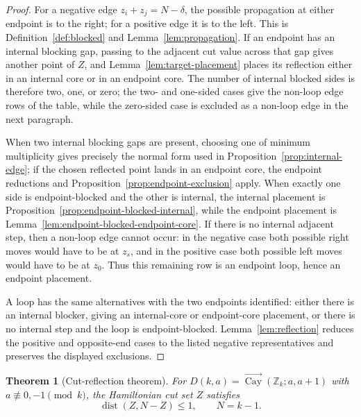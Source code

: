 \documentclass[11pt]{article}
\newtheorem{theorem}{Theorem}[section]
\newcommand{\Cay}{\overrightarrow{\operatorname{Cay}}}
\newcommand{\Z}{\mathbb Z}
\newcommand{\dist}{\operatorname{dist}}
\begin{document}
\begin{proof}
For a negative edge \(z_i+z_j=N-\delta\), the possible propagation at either endpoint is to the right; for a positive edge it is to the left.  This is Definition~\ref{def:blocked} and Lemma~\ref{lem:propagation}.  If an endpoint has an internal blocking gap, passing to the adjacent cut value across that gap gives another point of \(Z\), and Lemma~\ref{lem:target-placement} places its reflection either in an internal core or in an endpoint core.  The number of internal blocked sides is therefore two, one, or zero; the two- and one-sided cases give the non-loop edge rows of the table, while the zero-sided case is excluded as a non-loop edge in the next paragraph.

When two internal blocking gaps are present, choosing one of minimum multiplicity gives precisely the normal form used in Proposition~\ref{prop:internal-edge}; if the chosen reflected point lands in an endpoint core, the endpoint reductions and Proposition~\ref{prop:endpoint-exclusion} apply.  When exactly one side is endpoint-blocked and the other is internal, the internal placement is Proposition~\ref{prop:endpoint-blocked-internal}, while the endpoint placement is Lemma~\ref{lem:endpoint-blocked-endpoint-core}.  If there is no internal adjacent step, then a non-loop edge cannot occur: in the negative case both possible right moves would have to be at $z_s$, and in the positive case both possible left moves would have to be at $z_0$.  Thus this remaining row is an endpoint loop, hence an endpoint placement.

A loop has the same alternatives with the two endpoints identified: either there is an internal blocker, giving an internal-core or endpoint-core placement, or there is no internal step and the loop is endpoint-blocked.  Lemma~\ref{lem:reflection} reduces the positive and opposite-end cases to the listed negative representatives and preserves the displayed exclusions.
\end{proof}

\begin{theorem}[Cut-reflection theorem]\label{thm:near-antipodal}
For $D(k,a)=\Cay(\Z_k;a,a+1)$ with $a\not\equiv0,-1\pmod{k}$, the Hamiltonian cut set $Z$ satisfies
\[
        \dist(Z,N-Z)\le1,
        \qquad N=k-1.
\]
\end{theorem}
\end{document}
